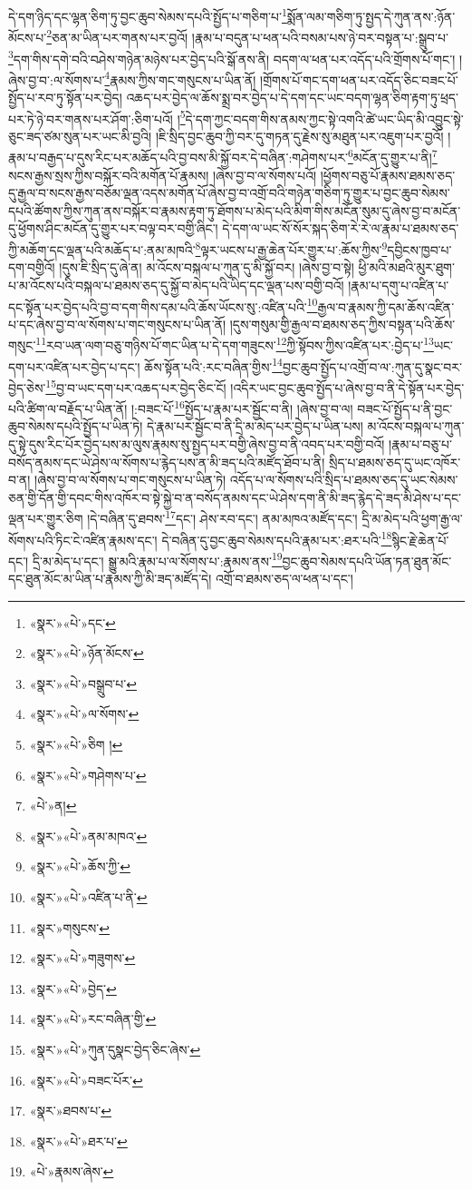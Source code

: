 དེ་དག་ཉིད་དང་ལྷན་ཅིག་ཏུ་བྱང་ཆུབ་སེམས་དཔའི་སྤྱོད་པ་གཅིག་པ་\footnote{«སྣར་»«པེ་»དང་}སྨོན་ལམ་གཅིག་ཏུ་སྤྱད་དེ་ཀུན་ནས་:ཉོན་མོངས་པ་\footnote{«སྣར་»«པེ་»ཉོན་མོངས་}ཅན་མ་ཡིན་པར་གནས་པར་བྱའོ། །རྣམ་པ་བདུན་པ་ཕན་པའི་བསམ་པས་ཉེ་བར་བསྟན་པ་:སྒྲུབ་པ་\footnote{«སྣར་»«པེ་»བསྒྲུབ་པ་}དག་གིས་དགེ་བའི་བཤེས་གཉེན་མཉེས་པར་བྱེད་པའི་སྒོ་ནས་ནི། བདག་ལ་ཕན་པར་འདོད་པའི་གྲོགས་པོ་གང་། །ཞེས་བྱ་བ་:ལ་སོགས་པ་\footnote{«སྣར་»«པེ་»ལ་སོགས་}རྣམས་ཀྱིས་གང་གསུངས་པ་ཡིན་ནོ། །གྲོགས་པོ་གང་དག་ཕན་པར་འདོད་ཅིང་བཟང་པོ་སྤྱོད་པ་རབ་ཏུ་སྟོན་པར་བྱེད། འཆད་པར་བྱེད་ལ་ཆོས་སྨྲ་བར་བྱེད་པ་དེ་དག་དང་ཡང་བདག་ལྷན་ཅིག་རྟག་ཏུ་ཕྲད་པར་ཏེ་ཉེ་བར་གནས་པར་ཤོག་:ཅིག་པའོ། །\footnote{«སྣར་»«པེ་»ཅིག །}དེ་དག་ཀྱང་བདག་གིས་ནམས་ཀྱང་སྟེ་འགའི་ཚེ་ཡང་ཡིད་མི་འབྱུང་སྟེ་ཅུང་ཟད་ཙམ་སུན་པར་ཡང་མི་བྱའི། །ཇི་སྲིད་བྱང་ཆུབ་ཀྱི་བར་དུ་གཏན་དུ་རྗེས་སུ་མཐུན་པར་འཇུག་པར་བྱའོ། །རྣམ་པ་བརྒྱད་པ་དུས་རིང་པར་མཆོད་པའི་བྱ་བས་མི་སྐྱོ་བར་དེ་བཞིན་:གཤེགས་པར་\footnote{«སྣར་»«པེ་»གཤེགས་པ་}མངོན་དུ་གྱུར་པ་ནི།\footnote{«པེ་»ན།} སངས་རྒྱས་སྲས་ཀྱིས་བསྐོར་བའི་མགོན་པོ་རྣམས། །ཞེས་བྱ་བ་ལ་སོགས་པའོ། །ཕྱོགས་བཅུ་པོ་རྣམས་ཐམས་ཅད་དུ་རྒྱལ་བ་སངས་རྒྱས་བཅོམ་ལྡན་འདས་མགོན་པོ་ཞེས་བྱ་བ་འགྲོ་བའི་གཉེན་གཅིག་ཏུ་གྱུར་པ་བྱང་ཆུབ་སེམས་དཔའི་ཚོགས་ཀྱིས་ཀུན་ནས་བསྐོར་བ་རྣམས་རྟག་ཏུ་ཐོགས་པ་མེད་པའི་མིག་གིས་མངོན་སུམ་དུ་ཞེས་བྱ་བ་མངོན་དུ་ཕྱོགས་ཤིང་མངོན་དུ་གྱུར་པར་བལྟ་བར་བགྱི་ཞིང་། དེ་དག་ལ་ཡང་སོ་སོར་སྐད་ཅིག་རེ་རེ་ལ་རྣམ་པ་ཐམས་ཅད་ཀྱི་མཆོག་དང་ལྡན་པའི་མཆོད་པ་:ནམ་མཁའི་\footnote{«སྣར་»«པེ་»ནམ་མཁའ་}ལྟར་ཡངས་པ་རྒྱ་ཆེན་པོར་གྱུར་པ་:ཆོས་ཀྱིས་\footnote{«སྣར་»«པེ་»ཆོས་ཀྱི་}དབྱིངས་ཁྱབ་པ་དག་བགྱིའོ། །དུས་ཇི་སྲིད་དུ་ཞེ་ན། མ་འོངས་བསྐལ་པ་ཀུན་དུ་མི་སྐྱོ་བར། །ཞེས་བྱ་བ་སྟེ། ཕྱི་མའི་མཐའི་མུར་ཐུག་པ་མ་འོངས་པའི་བསྐལ་པ་ཐམས་ཅད་དུ་སྐྱོ་བ་མེད་པའི་ཡིད་དང་ལྡན་པས་བགྱི་བའོ། །རྣམ་པ་དགུ་པ་འཛིན་པ་དང་སྟོན་པར་བྱེད་པའི་བྱ་བ་དག་གིས་དམ་པའི་ཆོས་ཡོངས་སུ་:འཛིན་པའི་\footnote{«སྣར་»«པེ་»འཛིན་པ་ནི་}རྒྱལ་བ་རྣམས་ཀྱི་དམ་ཆོས་འཛིན་པ་དང་ཞེས་བྱ་བ་ལ་སོགས་པ་གང་གསུངས་པ་ཡིན་ནོ། །དུས་གསུམ་གྱི་རྒྱལ་བ་ཐམས་ཅད་ཀྱིས་བསྟན་པའི་ཆོས་གསུང་\footnote{«སྣར་»གསུངས་}རབ་ཡན་ལག་བཅུ་གཉིས་པོ་གང་ཡིན་པ་དེ་དག་གཟུངས་\footnote{«སྣར་»«པེ་»གཟུགས་}ཀྱི་སྟོབས་ཀྱིས་འཛིན་པར་:བྱེད་པ་\footnote{«སྣར་»«པེ་»བྱེད་}ཡང་དག་པར་འཛིན་པར་བྱེད་པ་དང་། ཆོས་སྟོན་པའི་:རང་བཞིན་གྱིས་\footnote{«སྣར་»«པེ་»རང་བཞིན་གྱི་}བྱང་ཆུབ་སྤྱོད་པ་འགྲོ་བ་ལ་:ཀུན་དུ་སྣང་བར་བྱེད་ཅེས་\footnote{«སྣར་»«པེ་»ཀུན་དུསྣང་བྱེད་ཅིང་ཞེས་}བྱ་བ་ཡང་དག་པར་འཆད་པར་བྱེད་ཅིང་ངོ། །འདིར་ཡང་བྱང་ཆུབ་སྤྱོད་པ་ཞེས་བྱ་བ་ནི་དེ་སྟོན་པར་བྱེད་པའི་ཚིག་ལ་བརྗོད་པ་ཡིན་ནོ། །:བཟང་པོ་\footnote{«སྣར་»«པེ་»བཟང་པོར་}སྤྱོད་པ་རྣམ་པར་སྦྱོང་བ་ནི། །ཞེས་བྱ་བ་ལ། བཟང་པོ་སྤྱོད་པ་ནི་བྱང་ཆུབ་སེམས་དཔའི་སྤྱོད་པ་ཡིན་ཏེ། དེ་རྣམ་པར་སྦྱོང་བ་ནི་དྲི་མ་མེད་པར་བྱེད་པ་ཡིན་པས། མ་འོངས་བསྐལ་པ་ཀུན་དུ་སྟེ་དུས་རིང་པོར་བྱེད་པས་མ་ལུས་རྣམས་སུ་སྤྱད་པར་བགྱི་ཞེས་བྱ་བ་ནི་འབད་པར་བགྱི་བའོ། །རྣམ་པ་བཅུ་པ་བསོད་ནམས་དང་ཡེ་ཤེས་ལ་སོགས་པ་རྙེད་པས་ན་མི་ཟད་པའི་མཛོད་ཐོབ་པ་ནི། སྲིད་པ་ཐམས་ཅད་དུ་ཡང་འཁོར་བ་ན། །ཞེས་བྱ་བ་ལ་སོགས་པ་གང་གསུངས་པ་ཡིན་ཏེ། འདོད་པ་ལ་སོགས་པའི་སྲིད་པ་ཐམས་ཅད་དུ་ཡང་སེམས་ཅན་གྱི་དོན་གྱི་དབང་གིས་འཁོར་བ་སྟེ་སྐྱེ་བ་ན་བསོད་ནམས་དང་ཡེ་ཤེས་དག་ནི་མི་ཟད་རྙེད་དེ་ཟད་མི་ཤེས་པ་དང་ལྡན་པར་གྱུར་ཅིག །དེ་བཞིན་དུ་ཐབས་\footnote{«སྣར་»ཐབས་པ་}དང་། ཤེས་རབ་དང་། ནམ་མཁའ་མཛོད་དང་། དྲི་མ་མེད་པའི་ཕྱག་རྒྱ་ལ་སོགས་པའི་ཏིང་ངེ་འཛིན་རྣམས་དང་། དེ་བཞིན་དུ་བྱང་ཆུབ་སེམས་དཔའི་རྣམ་པར་:ཐར་པའི་\footnote{«སྣར་»«པེ་»ཐར་པ་}སྙིང་རྗེ་ཆེན་པོ་དང་། དྲི་མ་མེད་པ་དང་། སྒྱུ་མའི་རྣམ་པ་ལ་སོགས་པ་:རྣམས་ནས་\footnote{«པེ་»རྣམས་ཞེས་}བྱང་ཆུབ་སེམས་དཔའི་ཡོན་ཏན་ཐུན་མོང་དང་ཐུན་མོང་མ་ཡིན་པ་རྣམས་ཀྱི་མི་ཟད་མཛོད་དེ། འགྲོ་བ་ཐམས་ཅད་ལ་ཕན་པ་དང་། 
